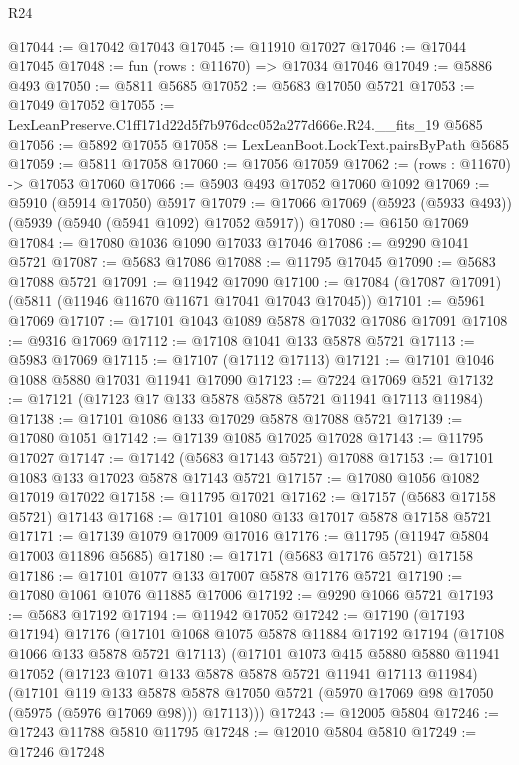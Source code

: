 \begin{lexlean}{R24}
\begin{coremodule}
@17044 := @17042 @17043
@17045 := @11910 @17027
@17046 := @17044 @17045
@17048 := fun (rows : @11670) => @17034 @17046
@17049 := @5886 @493
@17050 := @5811 @5685
@17052 := @5683 @17050 @5721
@17053 := @17049 @17052
@17055 := LexLeanPreserve.C1ff171d22d5f7b976dcc052a277d666e.R24.__fits_19 @5685
@17056 := @5892 @17055
@17058 := LexLeanBoot.LockText.pairsByPath @5685
@17059 := @5811 @17058
@17060 := @17056 @17059
@17062 := (rows : @11670) -> @17053 @17060
@17066 := @5903 @493 @17052 @17060 @1092
@17069 := @5910 (@5914 @17050) @5917
@17079 := @17066 @17069 (@5923 (@5933 @493)) (@5939 (@5940 (@5941 @1092) @17052 @5917))
@17080 := @6150 @17069
@17084 := @17080 @1036 @1090 @17033 @17046
@17086 := @9290 @1041 @5721
@17087 := @5683 @17086
@17088 := @11795 @17045
@17090 := @5683 @17088 @5721
@17091 := @11942 @17090
@17100 := @17084 (@17087 @17091) (@5811 (@11946 @11670 @11671 @17041 @17043 @17045))
@17101 := @5961 @17069
@17107 := @17101 @1043 @1089 @5878 @17032 @17086 @17091
@17108 := @9316 @17069
@17112 := @17108 @1041 @133 @5878 @5721
@17113 := @5983 @17069
@17115 := @17107 (@17112 @17113)
@17121 := @17101 @1046 @1088 @5880 @17031 @11941 @17090
@17123 := @7224 @17069 @521
@17132 := @17121 (@17123 @17 @133 @5878 @5878 @5721 @11941 @17113 @11984)
@17138 := @17101 @1086 @133 @17029 @5878 @17088 @5721
@17139 := @17080 @1051
@17142 := @17139 @1085 @17025 @17028
@17143 := @11795 @17027
@17147 := @17142 (@5683 @17143 @5721) @17088
@17153 := @17101 @1083 @133 @17023 @5878 @17143 @5721
@17157 := @17080 @1056 @1082 @17019 @17022
@17158 := @11795 @17021
@17162 := @17157 (@5683 @17158 @5721) @17143
@17168 := @17101 @1080 @133 @17017 @5878 @17158 @5721
@17171 := @17139 @1079 @17009 @17016
@17176 := @11795 (@11947 @5804 @17003 @11896 @5685)
@17180 := @17171 (@5683 @17176 @5721) @17158
@17186 := @17101 @1077 @133 @17007 @5878 @17176 @5721
@17190 := @17080 @1061 @1076 @11885 @17006
@17192 := @9290 @1066 @5721
@17193 := @5683 @17192
@17194 := @11942 @17052
@17242 := @17190
    (@17193 @17194)
    @17176
    (@17101
      @1068
      @1075
      @5878
      @11884
      @17192
      @17194
      (@17108 @1066 @133 @5878 @5721 @17113)
      (@17101
        @1073
        @415
        @5880
        @5880
        @11941
        @17052
        (@17123 @1071 @133 @5878 @5878 @5721 @11941 @17113 @11984)
        (@17101
          @119
          @133
          @5878
          @5878
          @17050
          @5721
          (@5970 @17069 @98 @17050 (@5975 (@5976 @17069 @98)))
          @17113)))
@17243 := @12005 @5804
@17246 := @17243 @11788 @5810 @11795
@17248 := @12010 @5804 @5810
@17249 := @17246 @17248

\end{coremodule}
\end{lexlean}
